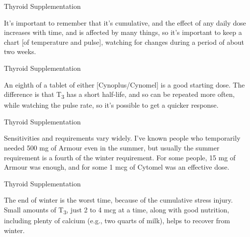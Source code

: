 \documentclass[11pt,oneside,openany,extrafontsizes]{memoir}
\begin{document}
\begin{standalonequote}{Thyroid Supplementation}

    \begin{answer}
        It's important to remember that it's cumulative, and the effect of any daily dose increases with time, and is affected by many things, so it's important to keep a chart [of temperature and pulse], watching for changes during a period of about two weeks.
    \end{answer}
\end{standalonequote}

\begin{standalonequote}{Thyroid Supplementation}

    \begin{answer}
        An eighth of a tablet of either [Cynoplus/Cynomel] is a good starting dose. The difference is that T\textsubscript{3} has a short half-life, and so can be repeated more often, while watching the pulse rate, so it's possible to get a quicker response.
    \end{answer}
\end{standalonequote}

\begin{standalonequote}{Thyroid Supplementation}

    \begin{answer}
        Sensitivities and requirements vary widely. I've known people who temporarily needed 500 mg of Armour even in the summer, but usually the summer requirement is a fourth of the winter requirement. For some people, 15 mg of Armour was enough, and for some 1 mcg of Cytomel was an effective dose.
    \end{answer}
\end{standalonequote}

\begin{standalonequote}{Thyroid Supplementation}

    \begin{answer}
        The end of winter is the worst time, because of the cumulative stress injury. Small amounts of T\textsubscript{3}, just 2 to 4 mcg at a time, along with good nutrition, including plenty of calcium (e.g., two quarts of milk), helps to recover from winter.
    \end{answer}
\end{standalonequote}
\end{document}
